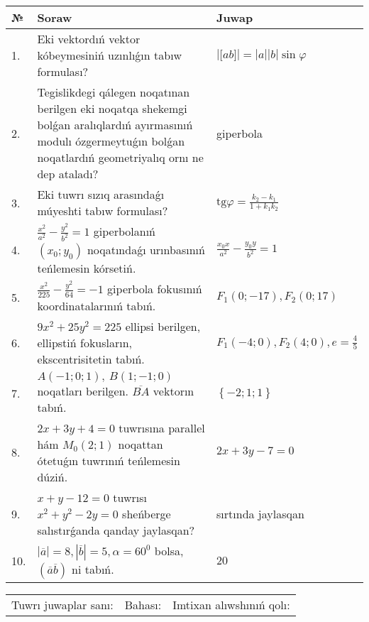 \documentclass{article}
\begin{document}
\begin{tabular}{|m{0.7cm}|m{10cm}|m{4cm}|}
\hline
№ & Soraw & Juwap \\
\hline
1. & Eki vektordıń vektor kóbeymesiniń uzınlıǵın tabıw formulası? & $\left| \lbrack ab\rbrack \right|=|a||b|\sin\varphi$ \\
\hline
2. & Tegislikdegi qálegen noqatınan berilgen eki noqatqa shekemgi bolǵan aralıqlardıń ayırmasınıń modulı ózgermeytuǵın bolǵan noqatlardıń geometriyalıq ornı ne dep ataladı? & giperbola \\
\hline
3. & Eki tuwrı sızıq arasındaǵı múyeshti tabıw formulası? & $\text{tg}\varphi=\frac{k_2-k_1}{1+k_1k_2}$ \\
\hline
4. & $\frac{x^2}{a^2}-\frac{y^2}{b^2}=1$ giperbolanıń $(x_0;y_0)$ noqatındaǵı urınbasınıń teńlemesin kórsetiń. & $\frac{x_0x}{a^2}-\frac{y_0y}{b^2}=1$ \\
\hline
5. & $\frac{x^{2}}{225}-\frac{y^{2}}{64}=-1$ giperbola fokusınıń koordinatalarınıń tabıń. & $F_{1}(0;-17), F_{2}(0;17)$ \\
\hline
6. & $9x^{2}+25y^{2}=225$ ellipsi berilgen, ellipstiń fokusların, ekscentrisitetin tabıń. & $F_1\left(-4;0 \right) , F_2\left( 4;0 \right) , e = \frac{4}{5}$ \\
\hline
7. & $A (-1;0;1),\ B (1;-1;0)$ noqatları berilgen. $\overline{BA}$ vektorın tabıń. & $\left\{ - 2;1;1 \right\}$ \\
\hline
8. & $2x+3y+4=0$ tuwrısına parallel hám $M_{0} (2;1)$ noqattan ótetuǵın tuwrınıń teńlemesin dúziń. & $2x+3y-7=0$ \\
\hline
9. & $x+y-12=0$ tuwrısı $x^{2}+y^{2}-2y=0$ sheńberge salıstırǵanda qanday jaylasqan? & sırtında jaylasqan \\
\hline
10. & $\left| \overline{a} \right|=8, \left| \overline{b} \right|=5, \alpha=60^{0}$ bolsa, $( \overline{a}\overline{b} )$ ni tabıń. & $20$ \\
\hline
\end{tabular}

\vspace{1cm}

\begin{tabular}{lll}
Tuwrı juwaplar sanı: \underline{\hspace{1.5cm}} & 
Bahası: \underline{\hspace{1.5cm}} & 
Imtixan alıwshınıń qolı: \underline{\hspace{2cm}} \\
\end{tabular}
\end{document}
